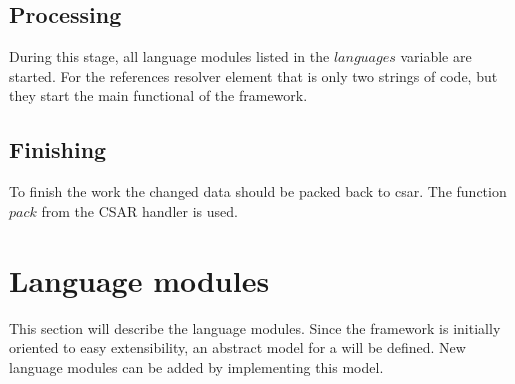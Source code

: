 \subsection*{Processing}
During this stage, all language modules listed in the $languages$ variable are started.
For the references resolver element that is only two strings of code, but they start the main functional of the framework.


\subsection*{Finishing}
To finish the work the changed data should be packed back to \gls{csar}.
The function $pack$ from the CSAR handler is used. 

\section{Language modules} 
This section will describe the language modules. %
Since the framework is initially oriented to easy extensibility, an abstract model for a  will be defined.
New language modules can be added by implementing this model.

